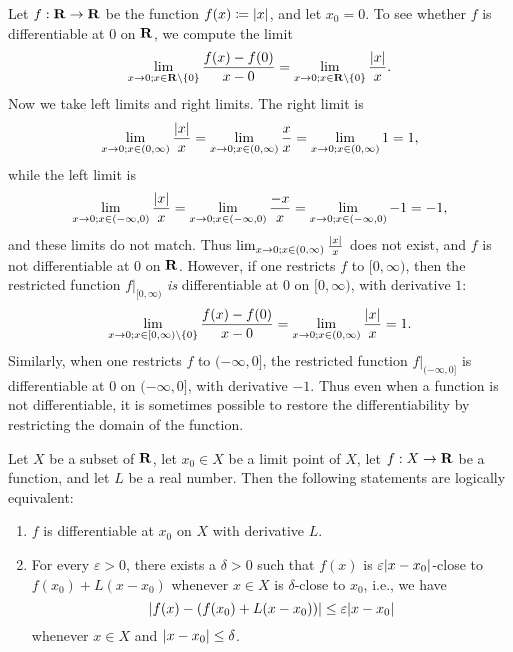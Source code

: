 \begin{example}\label{10.1.6}
    Let \(f : \mathbf{R} \to \mathbf{R}\) be the function \(f(x) \coloneqq \left\lvert x\right\rvert\), and let \(x_0 = 0\).
    To see whether \(f\) is differentiable at \(0\) on \(\mathbf{R}\), we compute the limit
    \[
        \lim_{x \to 0 ; x \in \mathbf{R} \setminus \{0\}} \frac{f(x) - f(0)}{x - 0} = \lim_{x \to 0 ; x \in \mathbf{R} \setminus \{0\}} \frac{\left\lvert x\right\rvert}{x}.
    \]
    Now we take left limits and right limits.
    The right limit is
    \[
        \lim_{x \to 0 ; x \in (0, \infty)} \frac{\left\lvert x\right\rvert}{x} = \lim_{x \to 0 ; x \in (0, \infty)} \frac{x}{x} = \lim_{x \to 0 ; x \in (0, \infty)} 1 = 1,
    \]
    while the left limit is
    \[
        \lim_{x \to 0 ; x \in (-\infty, 0)} \frac{\left\lvert x\right\rvert}{x} = \lim_{x \to 0 ; x \in (-\infty, 0)} \frac{-x}{x} = \lim_{x \to 0 ; x \in (-\infty, 0)} -1 = -1,
    \]
    and these limits do not match.
    Thus \(\lim_{x \to 0 ; x \in (0, \infty)} \frac{\left\lvert x\right\rvert}{x}\) does not exist, and \(f\) is not differentiable at \(0\) on \(\mathbf{R}\).
    However, if one restricts \(f\) to \([0, \infty)\), then the restricted function \(f|_{[0, \infty)}\) \emph{is} differentiable at \(0\) on \([0, \infty)\), with derivative \(1\):
    \[
    \lim_{x \to 0 ; x \in [0, \infty) \setminus \{0\}} \frac{f(x) - f(0)}{x - 0} = \lim_{x \to 0 ; x \in (0, \infty)} \frac{\left\lvert x\right\rvert}{x} = 1.
        \]
        Similarly, when one restricts \(f\) to \((-\infty, 0]\), the restricted function \(f|_{(-\infty, 0]}\) is differentiable at \(0\) on \((-\infty, 0]\), with derivative \(-1\).
    Thus even when a function is not differentiable, it is sometimes possible to restore the differentiability by restricting the domain of the function.
\end{example}

\begin{proposition}\label{10.1.7}
    Let \(X\) be a subset of \(\mathbf{R}\), let \(x_0 \in X\) be a limit point of \(X\), let \(f : X \to \mathbf{R}\) be a function, and let \(L\) be a real number.
    Then the following statements are logically equivalent:
    \begin{enumerate}
        \item \(f\) is differentiable at \(x_0\) on \(X\) with derivative \(L\).
        \item For every \(\varepsilon > 0\), there exists a \(\delta > 0\) such that \(f(x)\) is \(\varepsilon \abs{x - x_0}\)-close to \(f(x_0) + L(x - x_0)\) whenever \(x \in X\) is \(\delta\)-close to \(x_0\), i.e., we have
              \[
                  \abs{f(x) - (f(x_0) + L(x - x_0))} \leq \varepsilon \abs{x - x_0}
              \]
              whenever \(x \in X\) and \(\left\lvert x - x_0\right\rvert \leq \delta\).
    \end{enumerate}
\end{proposition}

